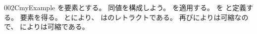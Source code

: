 \documentclass[index]{subfiles}
\begin{document}
\begin{myBlock}{002C}{myExample}
  を要素とする。
  同値を構成しよう。
  を適用する。
  を
  と定義する。
  要素を得る。
  とにより、
  はのレトラクトである。
  再びによりは可縮なので、
  によりは可縮である。
\end{myBlock}
\end{document}
